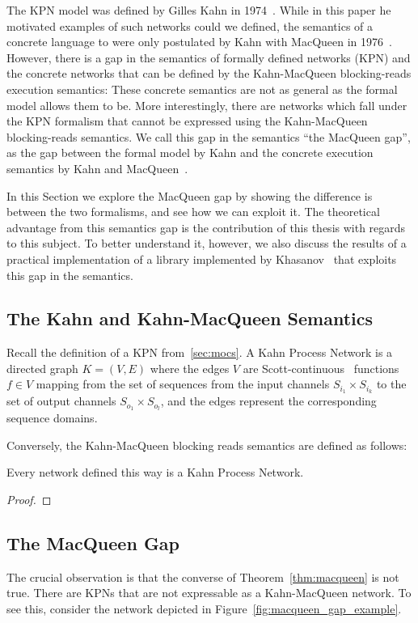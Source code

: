 The \ac{KPN} model was defined by Gilles Kahn in 1974~\cite{kahn74}. While in this paper he motivated examples of such networks could we defined, the semantics of a concrete language to were only postulated by Kahn with MacQueen in 1976~\cite{macqueen}. However, there is a gap in the semantics of formally defined networks (\ac{KPN}) and the concrete networks that can be defined by the Kahn-MacQueen blocking-reads execution semantics: These concrete semantics are not as general as the formal model allows them to be. More interestingly, there are networks which fall under the \ac{KPN} formalism that cannot be expressed using the Kahn-MacQueen blocking-reads semantics. We call this gap in the semantics ``the MacQueen gap'', as the gap between the formal model by Kahn and the concrete execution semantics by Kahn and MacQueen~\cite{lee_matsikoudis_semantics,khasanov_parmaditam18}. 

In this Section we explore the MacQueen gap by showing the difference is between the two formalisms, and see how we can exploit it. The theoretical advantage from this semantics gap is the contribution of this thesis with regards to this subject. To better understand it, however, we also discuss the results of a practical implementation of a library implemented by Khasanov~\cite{khasanov_parmaditam18} that exploits this gap in the semantics. 

\subsection{The Kahn and Kahn-MacQueen Semantics}

Recall the definition of a \ac{KPN} from~\ref{sec:mocs}.
A Kahn Process Network is a directed graph $K = (V,E)$ where the edges $V$ are Scott-continuous~\cite{scott_theory_of_computation} functions $f \in V$ mapping from the set of sequences from the input channels $S_{i_1} \times S_{i_k}$ to the set of output channels $S_{o_1} \times S_{o_l}$, and the edges represent the corresponding sequence domains.

Conversely, the Kahn-MacQueen blocking reads semantics are defined as follows: 
\begin{theorem}
\label{thm:macqueen}
Every network defined this way is a Kahn Process Network.
\begin{proof}
\end{proof}
\end{theorem}

\subsection{The MacQueen Gap}
The crucial observation is that the converse of Theorem~\ref{thm:macqueen} is not true. There are \acp{KPN} that are not expressable as a Kahn-MacQueen network. To see this, consider the network depicted in Figure~\ref{fig:macqueen_gap_example}.

